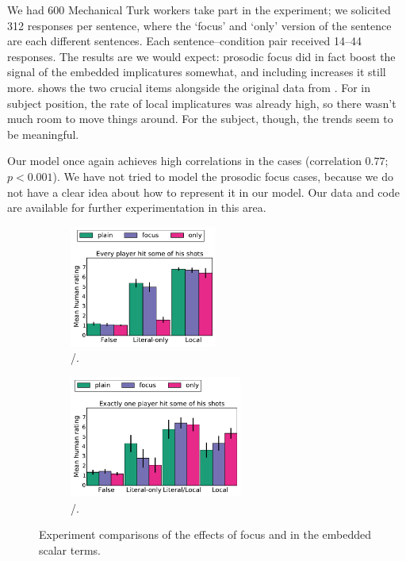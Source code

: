 \documentclass[leqno]{article}
\begin{document}
We had 600 Mechanical Turk workers take part in the experiment; we
solicited 312 responses per sentence, where the `focus' and `only'
version of the  sentence are each different sentences.
Each sentence--condition pair received 14--44 responses. The results
are we would expect: prosodic focus did in fact boost the signal of
the embedded implicatures somewhat, and including 
increases it still more.  shows the two crucial
items alongside the original data from . For
 in subject position, the rate of local implicatures was
already high, so there wasn't much room to move things around. For the
 subject, though, the trends seem to be meaningful.

Our model once again achieves high correlations in the 
cases (correlation $0.77$; $p < 0.001$). We have not tried to model
the prosodic focus cases, because we do not have a clear idea about
how to represent it in our model. Our data and code are available for
further experimentation in this area.

\begin{figure}[t]
  \begin{subfigure}{0.48\textwidth}
    \centering  
    \includegraphics[height=4cm]{fig/every-some-expcmp}
    \caption{/.}
    \label{fig:expcmp-everysome}
  \end{subfigure}
  \hfill
  \begin{subfigure}{0.48\textwidth}
    \centering  
    \includegraphics[height=4cm]{fig/exactlyone-some-expcmp}
    \caption{/.}
    \label{fig:expcmp-exactlyonesome}
  \end{subfigure}
  \caption{Experiment comparisons of the effects of focus and
   in the embedded scalar terms.}
  \label{fig:expcmp}
\end{figure}
\end{document}
